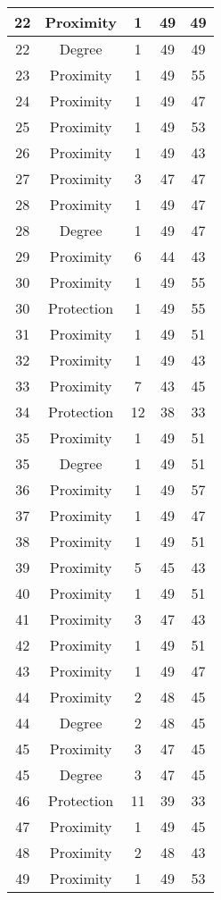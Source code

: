 \documentclass[results.tex]{subfiles}
\begin{document}
\begin{center}
\begin{tabular}{| c || c | c | c | c |}
    \hline
    22 & Proximity & 1 & 49 & 49 \\ 
    \hline
    22 & Degree & 1 & 49 & 49 \\ 
    \hline
    23 & Proximity & 1 & 49 & 55 \\ 
    \hline
    24 & Proximity & 1 & 49 & 47 \\ 
    \hline
    25 & Proximity & 1 & 49 & 53 \\ 
    \hline
    26 & Proximity & 1 & 49 & 43 \\ 
    \hline
    27 & Proximity & 3 & 47 & 47 \\ 
    \hline
    28 & Proximity & 1 & 49 & 47 \\ 
    \hline
    28 & Degree & 1 & 49 & 47 \\ 
    \hline
    29 & Proximity & 6 & 44 & 43 \\ 
    \hline
    30 & Proximity & 1 & 49 & 55 \\ 
    \hline
    30 & Protection & 1 & 49 & 55 \\ 
    \hline
    31 & Proximity & 1 & 49 & 51 \\ 
    \hline
    32 & Proximity & 1 & 49 & 43 \\ 
    \hline
    33 & Proximity & 7 & 43 & 45 \\ 
    \hline
    34 & Protection & 12 & 38 & 33 \\ 
    \hline
    35 & Proximity & 1 & 49 & 51 \\ 
    \hline
    35 & Degree & 1 & 49 & 51 \\ 
    \hline
    36 & Proximity & 1 & 49 & 57 \\ 
    \hline
    37 & Proximity & 1 & 49 & 47 \\ 
    \hline
    38 & Proximity & 1 & 49 & 51 \\ 
    \hline
    39 & Proximity & 5 & 45 & 43 \\ 
    \hline
    40 & Proximity & 1 & 49 & 51 \\ 
    \hline
    41 & Proximity & 3 & 47 & 43 \\ 
    \hline
    42 & Proximity & 1 & 49 & 51 \\ 
    \hline
    43 & Proximity & 1 & 49 & 47 \\ 
    \hline
    44 & Proximity & 2 & 48 & 45 \\ 
    \hline
    44 & Degree & 2 & 48 & 45 \\ 
    \hline
    45 & Proximity & 3 & 47 & 45 \\ 
    \hline
    45 & Degree & 3 & 47 & 45 \\ 
    \hline
    46 & Protection & 11 & 39 & 33 \\ 
    \hline
    47 & Proximity & 1 & 49 & 45 \\ 
    \hline
    48 & Proximity & 2 & 48 & 43 \\ 
    \hline
    49 & Proximity & 1 & 49 & 53 \\ 
    \hline   \end{tabular}
\end{center}
\end{document}
